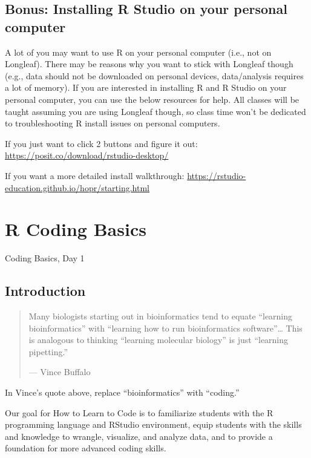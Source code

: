 \documentclass[
  letterpaper,
  DIV=11,
  numbers=noendperiod]{scrreprt}
\begin{document}
\section{Bonus: Installing R Studio on your personal
computer}\label{bonus-installing-r-studio-on-your-personal-computer}

A lot of you may want to use R on your personal computer (i.e., not on
Longleaf). There may be reasons why you want to stick with Longleaf
though (e.g., data should not be downloaded on personal devices,
data/analysis requires a lot of memory). If you are interested in
installing R and R Studio on your personal computer, you can use the
below resources for help. All classes will be taught assuming you are
using Longleaf though, so class time won't be dedicated to
troubleshooting R install issues on personal computers.

If you just want to click 2 buttons and figure it out:
\url{https://posit.co/download/rstudio-desktop/}

If you want a more detailed install walkthrough:
\url{https://rstudio-education.github.io/hopr/starting.html}


\chapter{R Coding Basics}\label{r-coding-basics}

Coding Basics, Day 1

\hfill\break

\section{Introduction}\label{introduction-1}

\begin{quote}
Many biologists starting out in bioinformatics tend to equate ``learning
bioinformatics'' with ``learning how to run bioinformatics
software''\ldots{} This is analogous to thinking ``learning molecular
biology'' is just ``learning pipetting.''

--- Vince Buffalo
\end{quote}

In Vince's quote above, replace ``bioinformatics'' with ``coding.''

Our goal for How to Learn to Code is to familiarize students with the R
programming language and RStudio environment, equip students with the
skills and knowledge to wrangle, visualize, and analyze data, and to
provide a foundation for more advanced coding skills.
\end{document}
